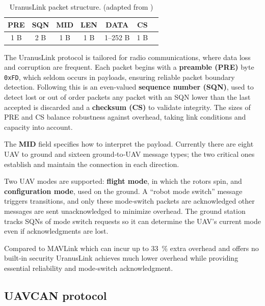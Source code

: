\begin{table}[h]
\centering
\begin{tabular}{|c|c|c|c|c|c|c|}
\hline
\textbf{PRE} & \textbf{SQN} & \textbf{MID} & \textbf{LEN} & \textbf{DATA} & \textbf{CS} \\
\hline
1 B & 2 B & 1 B & 1 B & 1–252 B & 1 B \\
\hline
\end{tabular}
\caption{UranusLink packet structure. (adapted from \cite{kriz2015uranuslink})}
\label{tab:uranuslink_pivoted}
\end{table}

The UranusLink protocol is tailored for radio communications, where data loss and corruption are frequent.  Each packet begins with a \textbf{preamble (PRE)} byte \texttt{0xFD}, which seldom occurs in payloads, ensuring reliable packet boundary detection.  Following this is an even-valued \textbf{sequence number (SQN)}, used to detect lost or out of order packets any packet with an SQN lower than the last accepted is discarded and a \textbf{checksum (CS)} to validate integrity.  The sizes of PRE and CS balance robustness against overhead, taking link conditions and capacity into account.

\vspace{0.5cm}

The \textbf{MID} field specifies how to interpret the payload.  Currently there are eight UAV to ground and sixteen ground‑to‑UAV message types; the two critical ones establish and maintain the connection in each direction.  

\vspace{0.5cm}

Two UAV modes are supported: \textbf{flight mode}, in which the rotors spin, and \textbf{configuration mode}, used on the ground.  A “robot mode switch” message triggers transitions, and only these mode‑switch packets are acknowledged other messages are sent unacknowledged to minimize overhead.  The ground station tracks SQNs of mode switch requests so it can determine the UAV’s current mode even if acknowledgments are lost.

\vspace{0.5cm}

Compared to MAVLink which can incur up to 33 \% extra overhead and offers no built‑in security UranusLink achieves much lower overhead while providing essential reliability and mode‑switch acknowledgment.



\subsection{UAVCAN protocol}

